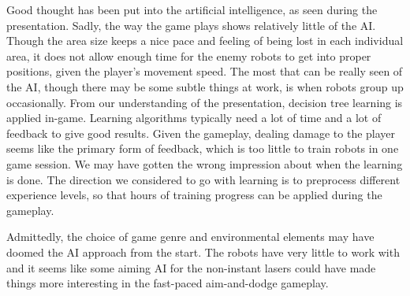 Good thought has been put into the artificial intelligence, as seen during the presentation. Sadly, the way the game plays shows relatively little of the AI. Though the area size keeps a nice pace and feeling of being lost in each individual area, it does not allow enough time for the enemy robots to get into proper positions, given the player’s movement speed. The most that can be really seen of the AI, though there may be some subtle things at work, is when robots group up occasionally. From our understanding of the presentation, decision tree learning is applied in-game. Learning algorithms typically need a lot of time and a lot of feedback to give good results. Given the gameplay, dealing damage to the player seems like the primary form of feedback, which is too little to train robots in one game session. We may have gotten the wrong impression about when the learning is done. The direction we considered to go with learning is to preprocess different experience levels, so that hours of training progress can be applied during the gameplay.

Admittedly, the choice of game genre and environmental elements may have doomed the AI approach from the start. The robots have very little to work with and it seems like some aiming AI for the non-instant lasers could have made things more interesting in the fast-paced aim-and-dodge gameplay.